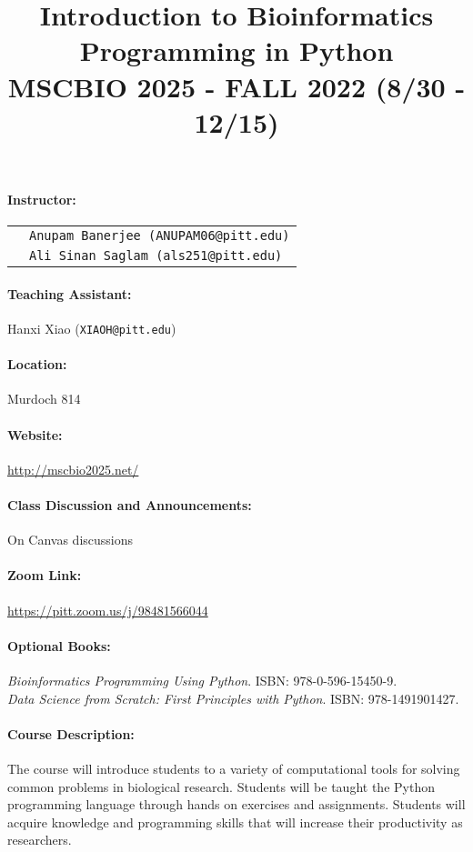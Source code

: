 \documentclass[11pt,letterpaper,oneside]{article}
\title{\bf \large \vspace{-.5in} Introduction to Bioinformatics Programming in Python\\MSCBIO 2025 - FALL 2022 (8/30 - 12/15)}
\author{}
\date{}
\begin{document}
\maketitle
\vspace{-.5in}
\thispagestyle{empty}
\vspace{-.25in}

\paragraph*{Instructor:} 
\begin{tabular}[t]{ll}
 & \texttt{Anupam Banerjee (ANUPAM06@pitt.edu)} \\
 & \texttt{Ali Sinan Saglam (als251@pitt.edu)} \\
\end{tabular}

\paragraph*{Teaching Assistant:} Hanxi Xiao (\texttt{XIAOH@pitt.edu})
\paragraph*{Location:} Murdoch 814
\paragraph*{Website:} \url{http://mscbio2025.net/}
\paragraph*{Class Discussion and Announcements:} On Canvas discussions
\paragraph*{Zoom Link:} \url{https://pitt.zoom.us/j/98481566044}
\paragraph*{Optional Books:} {\it Bioinformatics Programming Using Python}.  ISBN: 978-0-596-15450-9. \\
{\it Data Science from Scratch: First Principles with Python}. ISBN: 978-1491901427.

\paragraph*{Course Description:}
The course will introduce students to a variety of computational tools for solving common problems in biological research. Students will be taught the Python programming language through hands on exercises and assignments. Students will acquire knowledge and programming skills that will increase their productivity as researchers.
\end{document}
